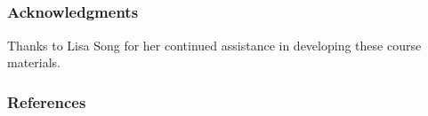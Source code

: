 \documentclass[11pt,aspectratio=169,hyperref={colorlinks}]{beamer}
\begin{document}
\subsection*{}

\begin{frame}[t]
	
	\frametitle{Acknowledgments}		
	
	Thanks to Lisa Song for her continued assistance in developing these course materials. 
	
\end{frame}
		

	\begin{frame}[t, allowframebreaks]
	
		\frametitle{References}	
		
		\printbibliography
		
	\end{frame}
\end{document}
